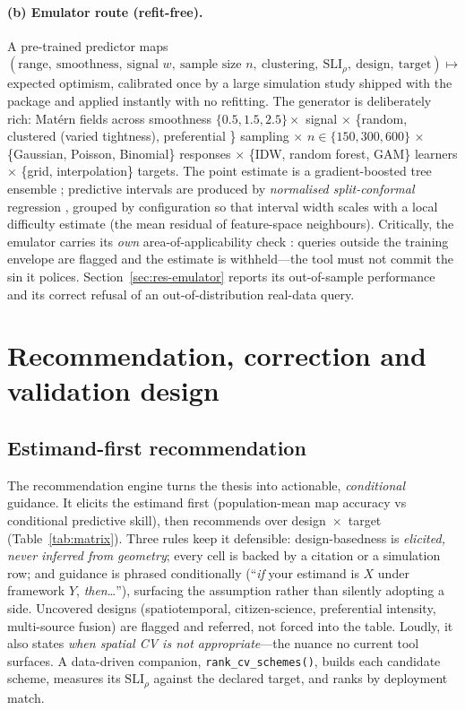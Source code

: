\documentclass[11pt,a4paper]{article}
\newcommand{\SLI}{\mathrm{SLI}}
\newcommand{\SLIrho}{\SLI_{\rho}}
\begin{document}
\paragraph{(b) Emulator route (refit-free).} A pre-trained predictor maps
$(\text{range},\ \text{smoothness},\ \text{signal } w,\ \text{sample size } n,\
\text{clustering},\ \SLIrho,\ \text{design},\ \text{target})\mapsto$ expected
optimism, calibrated once by a large simulation study shipped with the package and
applied instantly with no refitting. The generator is deliberately rich: Mat\'ern
fields across smoothness $\{0.5,1.5,2.5\}\times$ signal $\times$ \{random,
clustered (varied tightness), preferential \citep{diggle2010geostatistical}\}
sampling $\times$ $n\in\{150,300,600\}$ $\times$ \{Gaussian, Poisson, Binomial\}
responses $\times$ \{IDW, random forest, GAM\} learners $\times$ \{grid,
interpolation\} targets. The point estimate is a gradient-boosted tree ensemble
\citep{chen2016xgboost}; predictive intervals are produced by
\emph{normalised split-conformal} regression \citep{vovk2005algorithmic,
romano2019conformalized}, grouped by configuration so that interval width scales
with a local difficulty estimate (the mean residual of feature-space neighbours).
Critically, the emulator carries its \emph{own} area-of-applicability check
\citep{meyer2021aoa}: queries outside the training envelope are flagged and the
estimate is withheld---the tool must not commit the sin it polices.
Section~\ref{sec:res-emulator} reports its out-of-sample performance and its correct
refusal of an out-of-distribution real-data query.

\section{Recommendation, correction and validation design}\label{sec:recommend}

\subsection{Estimand-first recommendation}

The recommendation engine turns the thesis into actionable, \emph{conditional}
guidance. It elicits the estimand first (population-mean map accuracy vs conditional
predictive skill), then recommends over design~$\times$~target
(Table~\ref{tab:matrix}). Three rules keep it defensible: design-basedness is
\emph{elicited, never inferred from geometry}; every cell is backed by a citation or
a simulation row; and guidance is phrased conditionally (``\emph{if} your estimand
is $X$ under framework $Y$, \emph{then}\ldots''), surfacing the assumption rather
than silently adopting a side. Uncovered designs (spatiotemporal,
citizen-science, preferential intensity, multi-source fusion) are flagged and
referred, not forced into the table. Loudly, it also states \emph{when spatial CV is
not appropriate}---the nuance no current tool surfaces. A data-driven companion,
\texttt{rank\_cv\_schemes()}, builds each candidate scheme, measures its $\SLIrho$
against the declared target, and ranks by deployment match.
\end{document}
